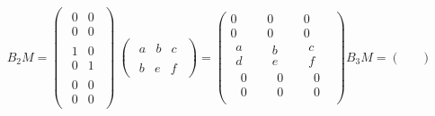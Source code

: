 \documentclass[oneside,english]{amsbook}
\numberwithin{section}{chapter}
\theoremstyle{plain}
\theoremstyle{definition}
\begin{document}
\[{B_{2}M = \begin{pmatrix}
		\begin{matrix}
			0 & 0 \\
			0 & 0
		\end{matrix} \\
		\begin{matrix}
			1 & 0 \\
			0 & 1
		\end{matrix} \\
		\begin{matrix}
			0 & 0 \\
			0 & 0
		\end{matrix}
	\end{pmatrix}\ \begin{pmatrix}
		\begin{matrix}
			a & b & c
		\end{matrix} \\
		\begin{matrix}
			b & e & f
		\end{matrix}
	\end{pmatrix} = \begin{pmatrix}
		0 & 0 & 0 \\
		0 & 0 & 0 \\
		\begin{matrix}
			a \\
			d \\
			\begin{matrix}
				0 \\
				0
			\end{matrix}
		\end{matrix} & \begin{matrix}
			b \\
			e \\
			\begin{matrix}
				0 \\
				0
			\end{matrix}
		\end{matrix} & \begin{matrix}
			c \\
			f \\
			\begin{matrix}
				0 \\
				0
			\end{matrix}
		\end{matrix}
	\end{pmatrix}
}{B_{3}M = \begin{pmatrix}
		\begin{matrix}

\end{matrix}
\end{pmatrix}}\]
\end{document}

